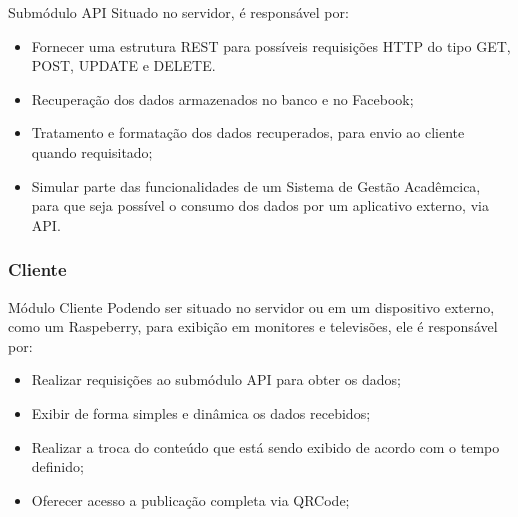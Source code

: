 \documentclass{aula-ifb}
\begin{document}
\begin{frame}{Submódulo API}
Situado no servidor, é responsável por:
	\begin{itemize}
		\item Fornecer uma estrutura REST para possíveis requisições HTTP do tipo GET, POST, UPDATE e DELETE.
		\vspace{10px}
   		\item Recuperação dos dados armazenados no banco e no Facebook;
   		\vspace{10px}
   		\item Tratamento e formatação dos dados recuperados, para envio ao cliente quando requisitado;
   		\vspace{10px}
   		\item Simular parte das funcionalidades de um Sistema de Gestão Acadêmcica, para que seja possível o consumo dos dados por um aplicativo externo, via API.
	\end{itemize}
\end{frame}

\subsubsection{Cliente}
\begin{frame}{Módulo Cliente}
Podendo ser situado no servidor ou em um dispositivo externo, como um Raspeberry, para exibição em monitores e televisões, ele é responsável por:
\begin{itemize}
   \item Realizar requisições ao submódulo API para obter os dados;
   \vspace{10px}
   \item Exibir de forma simples e dinâmica os dados recebidos;
   \vspace{10px}
   \item Realizar a troca do conteúdo que está sendo exibido de acordo com o tempo definido;
   \vspace{10px}
   \item Oferecer acesso a publicação completa via QRCode;
\end{itemize}
\end{frame}
\end{document}
